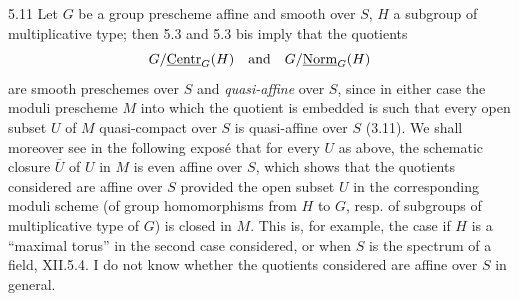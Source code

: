 \begin{remark}{5.11}\label{XI.5.11}
Let $G$ be a group prescheme affine and smooth over $S$, $H$ a subgroup of multiplicative type; then 5.3 and 5.3 bis imply that the quotients
\[
G/\underline{\mathrm{Centr}}_G(H)\quad\text{and}\quad G/\underline{\mathrm{Norm}}_G(H)
\]
are smooth preschemes over $S$ and \emph{quasi-affine} over $S$, since in either case the moduli prescheme $M$ into which the quotient is embedded is such that every open subset $U$ of $M$ quasi-compact over $S$ is quasi-affine over $S$ (3.11). We shall moreover see in the following exposé that for every $U$ as above, the schematic closure $\overline U$ of $U$ in $M$ is even affine over $S$, which shows that the quotients considered are affine over $S$ provided the open subset $U$ in the corresponding moduli scheme (of group homomorphisms from $H$ to $G$, resp. of subgroups of multiplicative type of $G$) is closed in $M$. This is, for example, the case if $H$ is a ``maximal torus'' in the second case considered, or when $S$ is the spectrum of a field, \cf XII.5.4. I do not know whether the quotients considered are affine over $S$ in general.
\end{remark}

